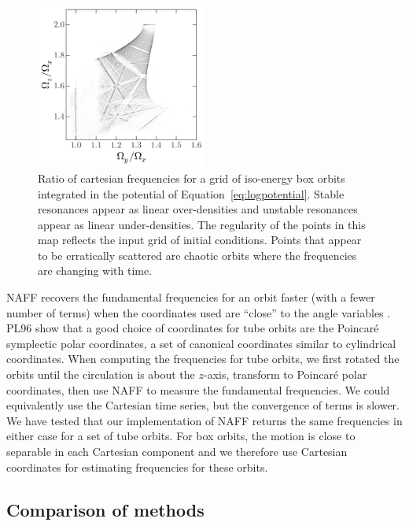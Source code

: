 \documentclass[letterpaper,12pt,preprint]{aastex}
\begin{document}
\begin{figure}[!h]
\begin{center}
\includegraphics[width=0.5\textwidth]{figures/log-freqmap.png}
\caption{Ratio of cartesian frequencies for a grid of iso-energy box orbits integrated in the potential of Equation~\ref{eq:logpotential}. Stable resonances appear as linear over-densities and unstable resonances appear as linear under-densities. The regularity of the points in this map reflects the input grid of initial conditions. Points that appear to be erratically scattered are chaotic orbits where the frequencies are changing with time.} \label{fig:logfreqs}
\end{center}
\end{figure}

NAFF recovers the fundamental frequencies for an orbit faster (with a fewer number of terms) when the coordinates used are ``close'' to the angle variables \cite[PL96][]{papaphilippou96}. PL96 show that a good choice of coordinates for tube orbits are the Poincar\'e symplectic polar coordinates, a set of canonical coordinates similar to cylindrical coordinates. When computing the frequencies for tube orbits, we first rotated the orbits until the circulation is about the $z$-axis, transform to Poincar\'e polar coordinates, then use NAFF to measure the fundamental frequencies. We could equivalently use the Cartesian time series, but the convergence of terms is slower. We have tested that our implementation of NAFF returns the same frequencies in either case for a set of tube orbits. For box orbits, the motion is close to separable in each Cartesian component and we therefore use Cartesian coordinates for estimating frequencies for these orbits.

\subsection{Comparison of methods}\label{sec:comparison}
\end{document}
